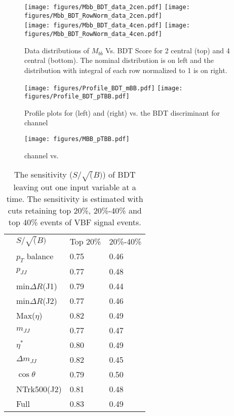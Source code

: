 \begin{figure}[htbp]
  \centering
 \texttt{[image: figures/Mbb\_BDT\_data\_2cen.pdf]}
 \texttt{[image: figures/Mbb\_BDT\_RowNorm\_data\_2cen.pdf]}\\
 \texttt{[image: figures/Mbb\_BDT\_data\_4cen.pdf]}
 \texttt{[image: figures/Mbb\_BDT\_RowNorm\_data\_4cen.pdf]}\\

\caption{Data distributions of $M_{b\bar b}$ Vs. BDT Score for 2 central (top) and 4 central (bottom). The nominal distribution is on left and the distribution with integral of each row normalized to 1 is on right.}
  \label{fig:Mbb_BDT_data}
\end{figure}


\begin{figure}[htbp]
  \centering
 \texttt{[image: figures/Profile\_BDT\_mBB.pdf]}
 \texttt{[image: figures/Profile\_BDT\_pTBB.pdf]}\\

\caption{Profile plots for \Mbb(left) and \pTbb(right) vs. the BDT discriminant for \twocentral channel}
  \label{fig:BDT_Profile}
\end{figure}


\begin{figure}[htbp]
  \centering
 \texttt{[image: figures/MBB\_pTBB.pdf]}
\caption{\twocentral channel \Mbb vs. \pTbb}
  \label{fig:MBB_pTBB}
\end{figure}


\begin{table}[]
\centering
\caption{The sensitivity ($S/\sqrt(B)$) of \twocentral BDT leaving out one input variable at a time. The sensitivity is estimated with cuts retaining top 20\%, 20\%-40\% and top 40\% events of VBF signal events.}
\label{tab:BDT-2cen-sensitivity}
\begin{tabular}{l|l|l|l|}
\cline{2-4}
 & $S/\sqrt(B)$      & Top 20\% & 20\%-40\% \\ \cline{2-4} 
 & $p_T$ balance     & 0.75     & 0.46      \\ \cline{2-4} 
 & $p_{JJ}$          & 0.77     & 0.48      \\ \cline{2-4} 
 & min$\Delta R$(J1) & 0.79     & 0.44      \\ \cline{2-4} 
 & min$\Delta R$(J2) & 0.77     & 0.46      \\ \cline{2-4} 
 & Max($\eta$)       & 0.82     & 0.49      \\ \cline{2-4} 
 & $m_{JJ}$          & 0.77     & 0.47      \\ \cline{2-4} 
 & $\eta^*$          & 0.80     & 0.49      \\ \cline{2-4} 
 & $\Delta m_{JJ}$   & 0.82     & 0.45      \\ \cline{2-4} 
 & $\cos{\theta}$    & 0.79     & 0.50      \\ \cline{2-4} 
 & NTrk500(J2)       & 0.81     & 0.48      \\ \cline{2-4} 
 & Full              & 0.83     & 0.49      \\ \cline{2-4} 
\end{tabular}
\end{table}


